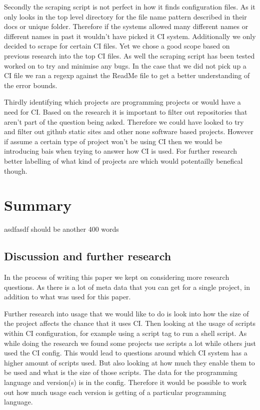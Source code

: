 \documentclass[twoside,12pt,titlepage,a4paper]{article}
\begin{document}
Secondly the scraping script is not perfect in how it finds configuration files. As it only looks in the top level directory for the file name pattern described in their docs or unique folder. Therefore if the systems allowed many different names or different names in past it wouldn't have picked it CI system. Additionally we only decided to scrape for certain CI files. Yet we chose a good scope based on previous research into the top CI files. As well the scraping script has been tested worked on to try and minimise any bugs. In the case that we did not pick up a CI file we ran a regexp against the ReadMe file to get a better understanding of the error bounds.

Thirdly identifying which projects are programming projects or would have a need for CI. Based on the research \cite{Kalliamvakou2014} it is important to filter out repositories that aren't part of the question being asked. Therefore we could have looked to try and filter out github static sites and other none software based projects. However if assume a certain type of project won't be using CI then we would be introducing bais when trying to answer how CI is used. For further research better labelling of what kind of projects are which would potentailly benefical though.



\pagebreak



\section{Summary}

asdfasdf
should be another 400 words


\vspace*{-0.05in}
\subsection{Discussion and further research}
\vspace*{-0.05in}
In the process of writing this paper we kept on considering more research questions. As there is a lot of meta data that you can get for a single project, in addition to what was used for this paper.

Further research into usage that we would like to do is look into how the size of the project affects the chance that it uses CI. Then looking at the usage of scripts within CI configuration, for example using a script tag to run a shell script. As while doing the research we found some projects use scripts a lot while others just used the CI config. This would lead to questions around which CI system has a higher amount of scripts used. But also looking at how much they enable them to be used and what is the size of those scripts.
The data for the programming language and version(s) is in the config. Therefore it would be possible to work out how much usage each version is getting of a particular programming language.
\end{document}
